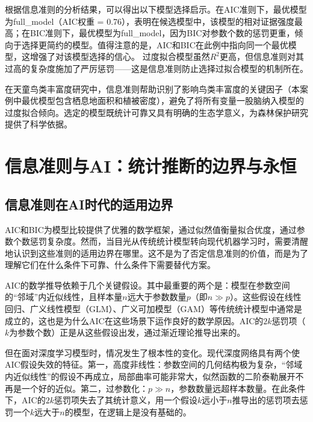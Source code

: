 \documentclass[
  twoside,12pt,fontset=none]{ctexbook}
\begin{document}
根据信息准则的分析结果，可以得出以下模型选择启示。在AIC准则下，最优模型为full\_model（AIC权重 = 0.76），表明在候选模型中，该模型的相对证据强度最高；在BIC准则下，最优模型为full\_model，因为BIC对参数个数的惩罚更重，倾向于选择更简约的模型。值得注意的是，AIC和BIC在此例中指向同一个最优模型，这增强了对该模型选择的信心。 过度拟合模型虽然\(R^2\)更高，但信息准则对其过高的复杂度施加了严厉惩罚------这是信息准则防止选择过拟合模型的机制所在。

在天童鸟类丰富度研究中，信息准则帮助识别了影响鸟类丰富度的关键因子（本案例中最优模型包含栖息地面积和植被密度），避免了将所有变量一股脑纳入模型的过度拟合倾向。选定的模型既统计可靠又具有明确的生态学意义，为森林保护研究提供了科学依据。

\hypertarget{ux4fe1ux606fux51c6ux5219ux4e0eaiux7edfux8ba1ux63a8ux65adux7684ux8fb9ux754cux4e0eux6c38ux6052}{%
\section{信息准则与AI：统计推断的边界与永恒}\label{ux4fe1ux606fux51c6ux5219ux4e0eaiux7edfux8ba1ux63a8ux65adux7684ux8fb9ux754cux4e0eux6c38ux6052}}

\hypertarget{ux4fe1ux606fux51c6ux5219ux5728aiux65f6ux4ee3ux7684ux9002ux7528ux8fb9ux754c}{%
\subsection{信息准则在AI时代的适用边界}\label{ux4fe1ux606fux51c6ux5219ux5728aiux65f6ux4ee3ux7684ux9002ux7528ux8fb9ux754c}}

AIC和BIC为模型比较提供了优雅的数学框架，通过似然值衡量拟合优度，通过参数个数惩罚复杂度。然而，当目光从传统统计模型转向现代机器学习时，需要清醒地认识到这些准则的适用边界在哪里。这不是为了否定信息准则的价值，而是为了理解它们在什么条件下可靠、什么条件下需要替代方案。

AIC的数学推导依赖于几个关键假设。其中最重要的两个是：模型在参数空间的``邻域''内近似线性，且样本量\(n\)远大于参数数量\(p\)（即\(n \gg p\)）。这些假设在线性回归、广义线性模型（GLM）、广义可加模型（GAM）等传统统计模型中通常是成立的，这也是为什么AIC在这些场景下运作良好的数学原因。AIC的\(2k\)惩罚项（\(k\)为参数个数）正是从这些假设出发，通过渐近理论推导出来的。

但在面对深度学习模型时，情况发生了根本性的变化。现代深度网络具有两个使AIC假设失效的特征。第一，高度非线性：参数空间的几何结构极为复杂，``邻域内近似线性''的假设不再成立，局部曲率可能非常大，似然函数的二阶泰勒展开不再是一个好的近似。第二，过参数化：\(p \gg n\)，参数数量远超样本数量。在此条件下，AIC的\(2k\)惩罚项失去了其统计意义，用一个假设\(k\)远小于\(n\)推导出的惩罚项去惩罚一个\(k\)远大于\(n\)的模型，在逻辑上是没有基础的。
\end{document}
